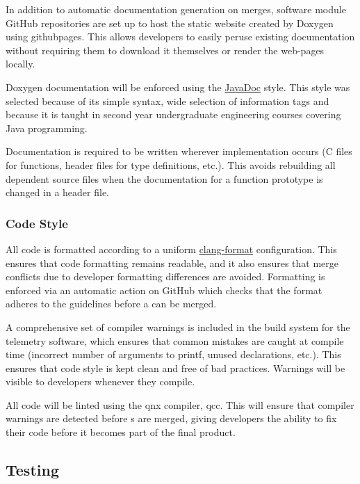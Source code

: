 In addition to automatic documentation generation on merges, software module GitHub repositories are set up to host the
static  website created by Doxygen using \gls{githubpages}. This allows developers to easily peruse
existing documentation without requiring them to download it themselves or render the web-pages locally.

Doxygen documentation will be enforced using the \href{https://www.doxygen.nl/manual/docblocks.html#cppblock}{JavaDoc}
style. This style was selected because of its simple syntax, wide selection of information tags and because it is
taught in second year undergraduate engineering courses covering Java programming.

Documentation is required to be written wherever implementation occurs (C files for functions, header files for type
definitions, etc.). This avoids rebuilding all dependent source files when the documentation for a function prototype
is changed in a header file. \cite{doxygen-headers}

\subsubsection{Code Style}

All code is formatted according to a uniform \href{https://clang.llvm.org/docs/ClangFormat.html}{clang-format}
configuration. This ensures that code formatting remains readable, and it also ensures that merge conflicts due to
developer formatting differences are avoided. Formatting is enforced via an automatic action on GitHub which checks
that the format adheres to the guidelines before a  can be merged.

A comprehensive set of compiler warnings is included in the build system for the telemetry software, which ensures that
common mistakes are caught at compile time (incorrect number of arguments to printf, unused declarations, etc.). This
ensures that code style is kept clean and free of bad practices. Warnings will be visible to developers whenever they
compile.

All code will be linted using the \gls{qnx} compiler, qcc. This will ensure that compiler warnings are detected before
s are merged, giving developers the ability to fix their code before it becomes part of the final
product.

\subsection{Testing}
